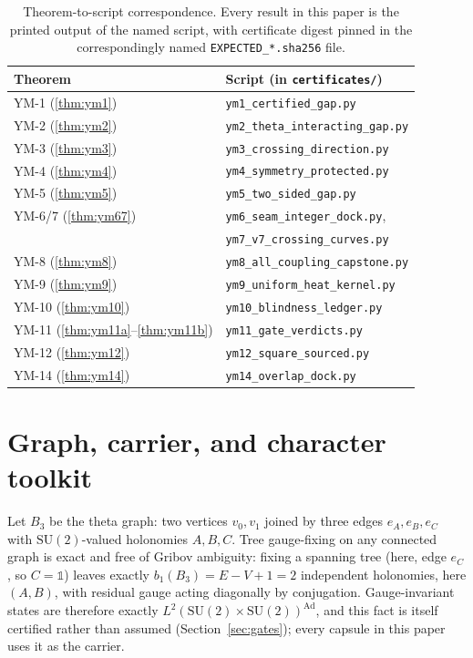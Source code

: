 \documentclass[aps,prd,twocolumn,superscriptaddress,nofootinbib]{revtex4-2}
\newcommand{\SU}{\mathrm{SU}(2)}
\begin{document}
\begin{table}[t]
\centering
\caption{Theorem-to-script correspondence. Every result in this paper is
the printed output of the named script, with certificate digest pinned
in the correspondingly named \texttt{EXPECTED\_*.sha256} file.}
\label{tab:map}
\begin{tabular}{ll}
\hline
Theorem & Script (in \texttt{certificates/}) \\
\hline
YM-1 (\ref{thm:ym1}) & \texttt{ym1\_certified\_gap.py} \\
YM-2 (\ref{thm:ym2}) & \texttt{ym2\_theta\_interacting\_gap.py} \\
YM-3 (\ref{thm:ym3}) & \texttt{ym3\_crossing\_direction.py} \\
YM-4 (\ref{thm:ym4}) & \texttt{ym4\_symmetry\_protected.py} \\
YM-5 (\ref{thm:ym5}) & \texttt{ym5\_two\_sided\_gap.py} \\
YM-6/7 (\ref{thm:ym67}) & \texttt{ym6\_seam\_integer\_dock.py},\\
                        & \texttt{ym7\_v7\_crossing\_curves.py} \\
YM-8 (\ref{thm:ym8}) & \texttt{ym8\_all\_coupling\_capstone.py} \\
YM-9 (\ref{thm:ym9}) & \texttt{ym9\_uniform\_heat\_kernel.py} \\
YM-10 (\ref{thm:ym10}) & \texttt{ym10\_blindness\_ledger.py} \\
YM-11 (\ref{thm:ym11a}--\ref{thm:ym11b}) & \texttt{ym11\_gate\_verdicts.py} \\
YM-12 (\ref{thm:ym12}) & \texttt{ym12\_square\_sourced.py} \\
YM-14 (\ref{thm:ym14}) & \texttt{ym14\_overlap\_dock.py} \\
\hline
\end{tabular}
\end{table}

\section{Graph, carrier, and character toolkit}\label{sec:setup}

Let $B_3$ be the theta graph: two vertices $v_0,v_1$ joined by three edges
$e_A,e_B,e_C$ with $\SU$-valued holonomies $A,B,C$. Tree gauge-fixing on
any connected graph is exact and free of Gribov ambiguity: fixing a
spanning tree (here, edge $e_C$, so $C=\mathbb{1}$) leaves exactly
$b_1(B_3)=E-V+1=2$ independent holonomies, here $(A,B)$, with residual
gauge acting diagonally by conjugation. Gauge-invariant states are
therefore exactly $L^2(\SU\times\SU)^{\mathrm{Ad}}$, and this fact is
itself certified rather than assumed (Section~\ref{sec:gates}); every
capsule in this paper uses it as the carrier.
\end{document}
